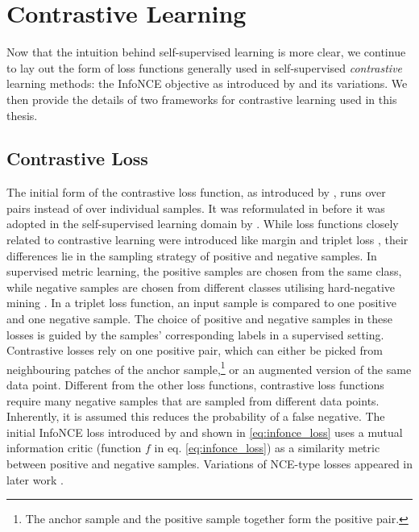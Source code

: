 \section{Contrastive Learning}\label{sec:contrastive_learning}
Now that the intuition behind self-supervised learning is more clear, we continue to lay out the form of loss functions generally used in self-supervised \textit{contrastive} learning methods: the InfoNCE objective as introduced by \cite{oord_representation_2019} and its variations. We then provide the details of two frameworks for contrastive learning used in this thesis.


\subsection{Contrastive Loss}
The initial form of the contrastive loss function, as introduced by \cite{contrastiveloss}, runs over pairs instead of over individual samples.
It was reformulated in \cite{gutmann_noise-contrastive_nodate} before it was adopted in the self-supervised learning domain by \cite{oord_representation_2019}.
While loss functions closely related to contrastive learning were introduced like margin and triplet loss \cite{marginloss, chechik_large_2009}, their differences lie in the sampling strategy of positive and negative samples.
In supervised metric learning, the positive samples are chosen from the same class, while negative samples are chosen from different classes utilising hard-negative mining \cite{8014803}.
In a triplet loss function, an input sample is compared to one positive and one negative sample.
The choice of positive and negative samples in these losses is guided by the samples' corresponding labels in a supervised setting.
Contrastive losses rely on one positive pair, which can either be picked from neighbouring patches of the anchor sample,\footnote{The anchor sample and the positive sample together form the positive pair.} or an augmented version of the same data point.
Different from the other loss functions, contrastive loss functions require many negative samples that are sampled from different data points.
Inherently, it is assumed this reduces the probability of a false negative.
The initial InfoNCE loss introduced by \cite{oord_representation_2019} and shown in \ref{eq:infonce_loss} uses a mutual information critic (function $f$ in eq. \ref{eq:infonce_loss}) as a similarity metric between positive and negative samples. Variations of NCE-type losses appeared in later work \cite{hjelm_learning_2019}.

